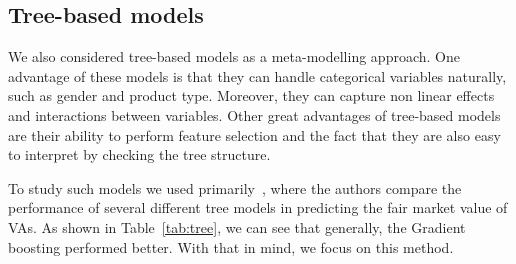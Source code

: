 \subsection{Tree-based models}\label{sec:tree_based_models}

We also considered tree-based models as a meta-modelling approach. One advantage of these models is that they can handle categorical variables naturally, such as gender and product type. Moreover, they can capture non linear effects and interactions between variables. Other great advantages of tree-based models are their ability to perform feature selection and the fact that they are also easy to interpret by checking the tree structure.




				

To study such models we used primarily~\cite{quan2018tree}, where the authors compare the performance of several different tree models in predicting the fair market value of VAs. As shown in Table~\ref{tab:tree}, we can see that generally, the Gradient boosting performed better. With that in mind, we focus on this method.

